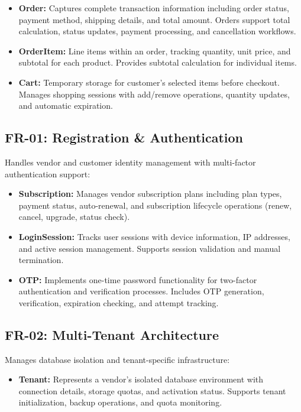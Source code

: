 \begin{enumerate}
\begin{itemize}
    \item \textbf{Order:} Captures complete transaction information including order status, payment method, shipping details, and total amount. Orders support total calculation, status updates, payment processing, and cancellation workflows.
    
    \item \textbf{OrderItem:} Line items within an order, tracking quantity, unit price, and subtotal for each product. Provides subtotal calculation for individual items.
    
    \item \textbf{Cart:} Temporary storage for customer's selected items before checkout. Manages shopping sessions with add/remove operations, quantity updates, and automatic expiration.
\end{itemize}

\subsection*{FR-01: Registration \& Authentication}
Handles vendor and customer identity management with multi-factor authentication support:

\begin{itemize}
    \item \textbf{Subscription:} Manages vendor subscription plans including plan types, payment status, auto-renewal, and subscription lifecycle operations (renew, cancel, upgrade, status check).
    
    \item \textbf{LoginSession:} Tracks user sessions with device information, IP addresses, and active session management. Supports session validation and manual termination.
    
    \item \textbf{OTP:} Implements one-time password functionality for two-factor authentication and verification processes. Includes OTP generation, verification, expiration checking, and attempt tracking.
\end{itemize}

\subsection*{FR-02: Multi-Tenant Architecture}
Manages database isolation and tenant-specific infrastructure:

\begin{itemize}
    \item \textbf{Tenant:} Represents a vendor's isolated database environment with connection details, storage quotas, and activation status. Supports tenant initialization, backup operations, and quota monitoring.
    

\end{itemize}
\end{enumerate}
